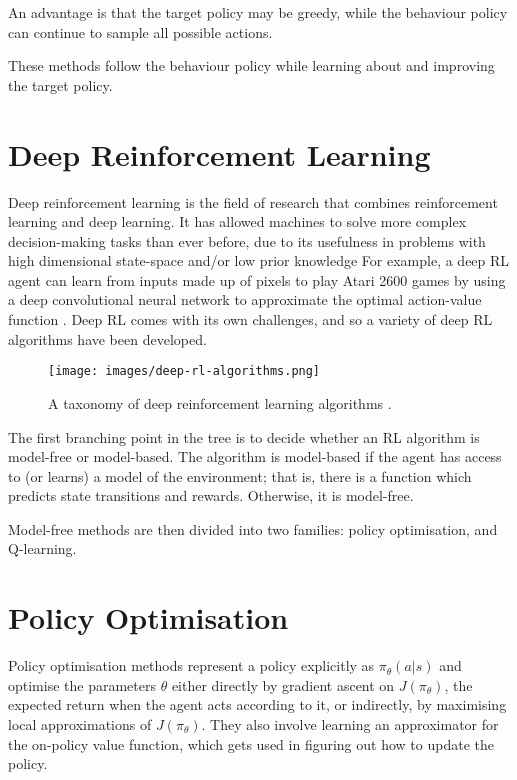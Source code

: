 \documentclass{article}
\begin{document}
An advantage is that the target policy may be greedy, while the
behaviour policy can continue to sample all possible actions.

These methods follow the behaviour policy while learning about and
improving the target policy.

\section{Deep Reinforcement Learning}

Deep reinforcement learning is the field of research that combines reinforcement learning and deep learning. It has allowed machines to solve more complex decision-making tasks than ever before, due to its usefulness in problems with high dimensional state-space and/or low prior knowledge \cite{DBLP:journals/corr/abs-1811-12560} For example, a deep RL agent can learn from inputs made up of pixels to play Atari 2600 games by using a deep convolutional neural network to approximate the optimal action-value function \cite{Mnih2015}. Deep RL comes with its own challenges, and so a variety of deep RL algorithms have been developed.

\begin{figure}[h]
  \centering
  \texttt{[image: images/deep-rl-algorithms.png]}
  \caption{A taxonomy of deep reinforcement learning algorithms \cite{openai_2018}.}
  \label{fig:deep-rl-algorithms}
\end{figure}

The first branching point in the tree is to decide whether an RL algorithm is model-free or model-based. The algorithm is model-based if the agent has access to (or learns) a model of the environment; that is, there is a function which predicts state transitions and rewards. Otherwise, it is model-free.

Model-free methods are then divided into two families: policy optimisation, and Q-learning.

\section{Policy Optimisation \cite{openai_2018}} 

Policy optimisation methods represent a policy explicitly as $\pi_\theta(a|s)$ and optimise the parameters $\theta$ either directly by gradient ascent on $J(\pi_\theta)$, the expected return when the agent acts according to it, or indirectly, by maximising local approximations of $J(\pi_\theta)$. They also involve learning an approximator for the on-policy value function, which gets used in figuring out how to update the policy.
\end{document}
